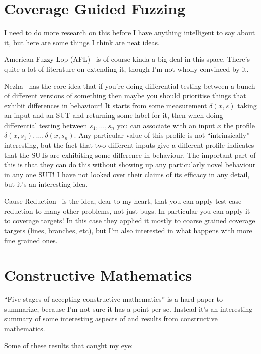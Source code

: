 \section{Coverage Guided Fuzzing}

I need to do more research on this before I have anything intelligent to say about it,
but here are some things I think are neat ideas.

American Fuzzy Lop (AFL)~\cite{AFL} is of course kinda a big deal in this space.
There's quite a lot of literature on extending it,
though I'm not wholly convinced by it.

Nezha~\cite{DBLP:conf/sp/PetsiosTSKJ17} has the core idea that if you're doing differential testing between a bunch of different versions of something then maybe you should prioritise things that exhibit differences in behaviour!
It starts from some measurement \(\delta(x, s)\) taking an input and an SUT and returning some label for it,
then when doing differential testing between \(s_1, \ldots, s_n\) you can associate with an input \(x\) the profile \(\delta(x, s_1), \ldots, \delta(x, s_n)\).
Any particular value of this profile is not ``intrinsically'' interesting,
but the fact that two different inputs give a different profile indicates that the SUTs are exhibiting some difference in behaviour.
The important part of this is that they can do this without showing up any particularly novel behaviour in any one SUT!\@
I have not looked over their claims of its efficacy in any detail,
but it's an interesting idea.

Cause Reduction~\cite{DBLP:journals/stvr/GroceAZCR16} is the idea,
dear to my heart,
that you can apply test case reduction to many other problems,
not just bugs.
In particular you can apply it to coverage targets!
In this case they applied it mostly to coarse grained coverage targets (lines, branches, etc),
but I'm also interested in what happens with more fine grained ones.

\section{Constructive Mathematics}

``Five stages of accepting constructive mathematics''\cite{bauer2017five} is a hard paper to summarize,
because I'm not sure it has a point per se.
Instead it's an interesting summary of some interesting aspects of and results from constructive mathematics.

Some of these results that caught my eye:

